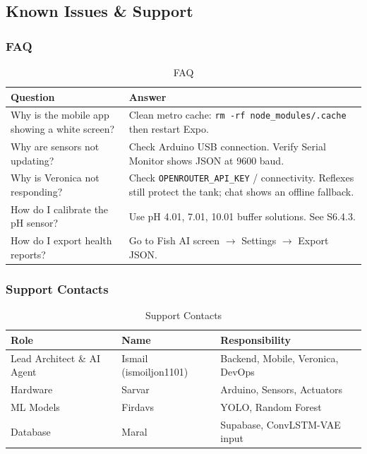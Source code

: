 \documentclass[12pt,a4paper,oneside]{article}
\begin{document}
\subsection{Known Issues \& Support}

\subsubsection{FAQ}
\begin{table}[H]
    \centering
    \begin{tabularx}{\textwidth}{lX}
        \toprule
        \textbf{Question} & \textbf{Answer} \\
        \midrule
        Why is the mobile app showing a white screen? & Clean metro cache: \texttt{rm -rf node\_modules/.cache} then restart Expo. \\
        Why are sensors not updating? & Check Arduino USB connection. Verify Serial Monitor shows JSON at 9600 baud. \\
        Why is Veronica not responding? & Check \texttt{OPENROUTER\_API\_KEY} / connectivity. Reflexes still protect the tank; chat shows an offline fallback. \\
        How do I calibrate the pH sensor? & Use pH 4.01, 7.01, 10.01 buffer solutions. See S6.4.3. \\
        How do I export health reports? & Go to Fish AI screen $\rightarrow$ Settings $\rightarrow$ Export JSON. \\
        \bottomrule
    \end{tabularx}
    \caption{FAQ}
\end{table}

\subsubsection{Support Contacts}
\begin{table}[H]
    \centering
    \begin{tabularx}{\textwidth}{llX}
        \toprule
        \textbf{Role} & \textbf{Name} & \textbf{Responsibility} \\
        \midrule
        Lead Architect \& AI Agent & Ismail (ismoiljon1101) & Backend, Mobile, Veronica, DevOps \\
        Hardware & Sarvar & Arduino, Sensors, Actuators \\
        ML Models & Firdavs & YOLO, Random Forest \\
        Database & Maral & Supabase, ConvLSTM-VAE input \\
        \bottomrule
    \end{tabularx}
    \caption{Support Contacts}
\end{table}
\end{document}
